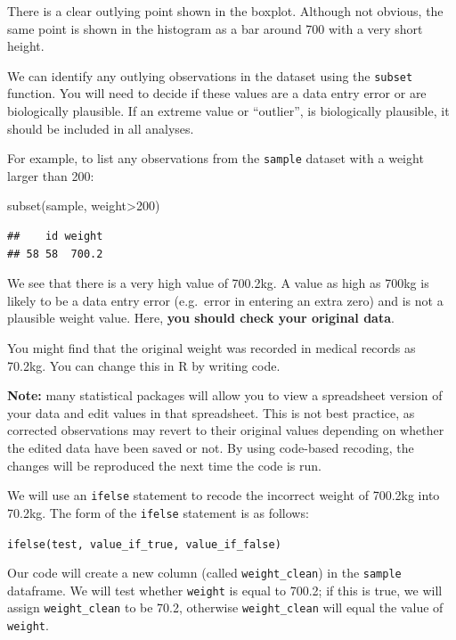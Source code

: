 \documentclass[
]{memoir}
\newenvironment{Shaded}{\begin{snugshade}}{\end{snugshade}}
\newcommand{\DecValTok}[1]{\textcolor[rgb]{0.00,0.00,0.81}{#1}}
\newcommand{\FunctionTok}[1]{\textcolor[rgb]{0.00,0.00,0.00}{#1}}
\newcommand{\NormalTok}[1]{#1}
\newcommand{\SpecialCharTok}[1]{\textcolor[rgb]{0.00,0.00,0.00}{#1}}
\begin{document}
There is a clear outlying point shown in the boxplot. Although not obvious, the same point is shown in the histogram as a bar around 700 with a very short height.

We can identify any outlying observations in the dataset using the \texttt{subset} function. You will need to decide if these values are a data entry error or are biologically plausible. If an extreme value or ``outlier'', is biologically plausible, it should be included in all analyses.

For example, to list any observations from the \texttt{sample} dataset with a weight larger than 200:

\begin{Shaded}
\begin{Highlighting}[]
\FunctionTok{subset}\NormalTok{(sample, weight}\SpecialCharTok{\textgreater{}}\DecValTok{200}\NormalTok{)}
\end{Highlighting}
\end{Shaded}

\begin{verbatim}
##    id weight
## 58 58  700.2
\end{verbatim}

We see that there is a very high value of 700.2kg. A value as high as 700kg is likely to be a data entry error (e.g.~error in entering an extra zero) and is not a plausible weight value. Here, \textbf{you should check your original data}.

You might find that the original weight was recorded in medical records as 70.2kg. You can change this in R by writing code.

\textbf{Note:} many statistical packages will allow you to view a spreadsheet version of your data and edit values in that spreadsheet. This is not best practice, as corrected observations may revert to their original values depending on whether the edited data have been saved or not. By using code-based recoding, the changes will be reproduced the next time the code is run.

We will use an \texttt{ifelse} statement to recode the incorrect weight of 700.2kg into 70.2kg. The form of the \texttt{ifelse} statement is as follows:

\texttt{ifelse(test,\ value\_if\_true,\ value\_if\_false)}

Our code will create a new column (called \texttt{weight\_clean}) in the \texttt{sample} dataframe. We will test whether \texttt{weight} is equal to 700.2; if this is true, we will assign \texttt{weight\_clean} to be 70.2, otherwise \texttt{weight\_clean} will equal the value of \texttt{weight}.
\end{document}

